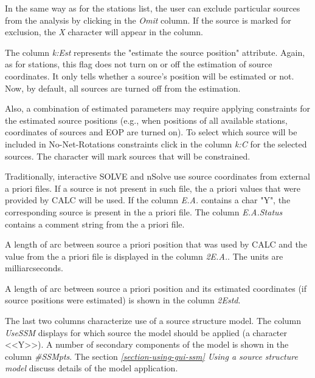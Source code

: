 \documentclass [10pt,letterpaper]{report}
\newcommand{\nuSolve}{\greektext n\latintext Solve}
\begin{document}
In the same way as for the stations list, the user can exclude particular sources
from the analysis by clicking in the {\sl Omit} column. If the source is marked for
exclusion, the {\sl X} character will appear in the column.

The column {\sl k:Est} represents the "estimate the source position" attribute.
Again, as for stations, this flag does not turn on or off the estimation of source
coordinates.
It only tells whether a source's position will be estimated or not.
Now, by default, all sources are turned off from the estimation.

Also, a combination of estimated parameters may require applying constraints
for the estimated source positions (e.g., when positions of all available stations,
coordinates of sources and EOP are turned on). To select which source will
be included in No-Net-Rotations constraints click in the column {\sl k:C}
for the selected sources. The character {\sl *} will mark sources that will
be constrained.

Traditionally, interactive SOLVE and \nuSolve{} use source coordinates from
external a priori files. If a source is not present in such file, the a priori
values that were provided by CALC will be used. If the column {\sl E.A.}
contains a char "Y", the corresponding source is present in the a priori file.
The column {\sl E.A.Status} contains a comment string from the a priori file.

A length of arc between source a priori position that was
used by CALC and the value from the a priori file is displayed in the column
{\sl 2E.A.}. The units are milliarcseconds.

A length of arc between source a priori position and its estimated coordinates
(if source positions were estimated) is shown in the column {\sl 2Estd}.

The last two columns characterize use of a source structure model. The column
{\sl UseSSM} displays for which source the model should be applied (a character
<<Y>>). A number of secondary components of the model is shown in the column
{\sl \#SSMpts}. The section \emph{\ref{section-using-gui-ssm} Using a source structure model}
discuss details of the model application.



\end{document}
